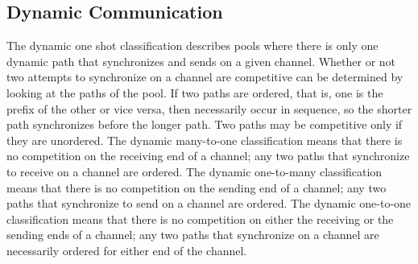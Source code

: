 \documentclass[10pt]{article}
\begin{document}
\subsection{Dynamic Communication}

The dynamic one shot classification describes pools where there is only one dynamic path
that synchronizes and sends on a given channel. Whether or not two attempts to
synchronize on a channel are competitive can be determined by
looking at the paths of the pool. If two paths are ordered, that is, one is the
prefix of the other or vice versa, then necessarily
occur in sequence, so the shorter path synchronizes before the longer path. Two paths may
be competitive only if they are unordered. The dynamic many-to-one classification means that
there is no competition on the receiving end of a channel; any two paths that synchronize to
receive on a channel are ordered. The dynamic one-to-many classification means that there
is no competition on the sending end of a channel; any two paths that synchronize to
send on a channel are ordered. The dynamic one-to-one classification means that there is no
competition on either the receiving or the sending ends of a channel; any two paths that
synchronize on a channel are necessarily ordered for either end of the channel. 
\end{document}
